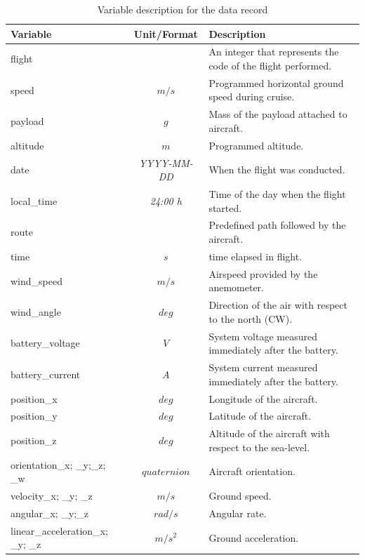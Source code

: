 \documentclass[fleqn,10pt]{wlscirep}
\begin{document}
\begin{table}[H]
\centering
\caption{\label{tab:variables} Variable description for the data record}
\begin{tabular}{|l|c|l|}
\hline
Variable & Unit/Format & Description \\
\hline
flight &  & An integer that represents the code of the flight performed. \\
\hline
speed & $m/s$  & Programmed horizontal ground speed during cruise. \\
\hline
payload & $g$ & Mass of the payload attached to aircraft. \\
\hline
altitude & $m$ & Programmed altitude. \\
\hline
date & \textit{YYYY-MM-DD} & When the flight was conducted.
  \\
\hline
local\_time & \textit{24:00 h} &  Time of the day when the flight started. \\
\hline
route &  & Predefined path followed by the aircraft.\\
\hline
time & $s$ & time elapsed in flight. \\
\hline
wind\_speed & $m/s$ & Airspeed provided by the anemometer. \\
\hline
wind\_angle & $deg$ & Direction of the air with respect to the north (CW).
 \\
\hline
battery\_voltage & $V$ & System voltage measured immediately after the battery. \\
\hline
battery\_current & $A$ & System current measured immediately after the battery. \\
\hline
position\_x & $deg$ & Longitude of the aircraft.
 \\
\hline
position\_y & $deg$ & Latitude of the aircraft. \\
\hline
position\_z & $deg$ & Altitude of the aircraft with respect to the sea-level. \\
\hline
orientation\_x; \_y;\_z; \_w & $quaternion$ & Aircraft orientation. \\
\hline
velocity\_x; \_y; \_z & $m/s$ & Ground speed. \\
\hline
angular\_x; \_y;\_z & $rad/s$ & Angular rate. \\
\hline
linear\_acceleration\_x; \_y; \_z & $m/s^2$ & Ground acceleration. \\
\hline
\end{tabular}

\end{table}
\end{document}
